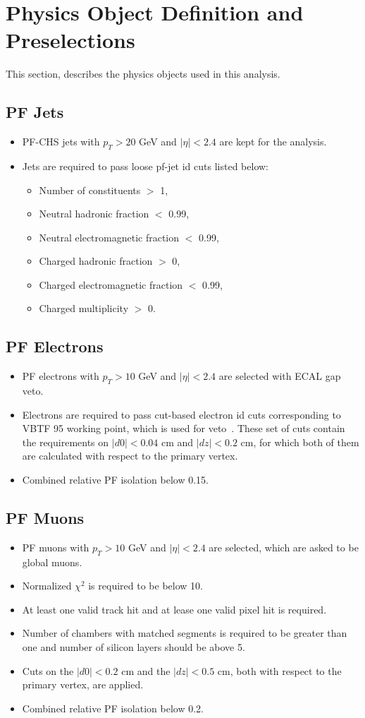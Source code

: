 \section{Physics Object Definition and Preselections}
\label{sect:objdef}
This section, describes the physics objects used in this analysis. 
\subsection{PF Jets}
\begin{itemize}
\item PF-CHS jets with $p_T>20$ GeV and $|\eta|<2.4$ are kept for the analysis.
\item Jets are required to pass loose pf-jet id cuts listed below:
\begin{itemize}
\item Number of constituents $>$ 1,
\item Neutral hadronic fraction $<$ 0.99,
\item Neutral electromagnetic fraction $<$ 0.99,
\item Charged hadronic fraction $>$ 0,
\item Charged electromagnetic fraction $<$ 0.99,
\item Charged multiplicity $>$ 0.
\end{itemize}
\end{itemize}
\subsection{PF Electrons}
\begin{itemize}
\item PF electrons with $p_T>10$ GeV and $|\eta|<2.4$ are selected with ECAL gap veto.
\item Electrons are required to pass cut-based electron id cuts corresponding to VBTF 95 working point, which is used for veto~\cite{eIDs}. These set of cuts contain the requirements on $|d0|<0.04$ cm and $|dz|<0.2$ cm, for which both of them are calculated with respect to the primary vertex. 
\item Combined relative PF isolation below 0.15.
\end{itemize}
\subsection{PF Muons}
\begin{itemize}
\item PF muons with $p_T>10$ GeV and $|\eta|<2.4$ are selected, which are asked to be global muons.
\item Normalized $\chi^2$ is required to be below 10.
\item At least one valid track hit and at lease one valid pixel hit is required.  
\item Number of chambers with matched segments is required to be greater than one and number of silicon layers should be above 5. 
\item Cuts on the $|d0|<0.2$ cm and the $|dz|<0.5$ cm, both with respect to the primary vertex, are applied.
\item Combined relative PF isolation below 0.2.
\end{itemize}

